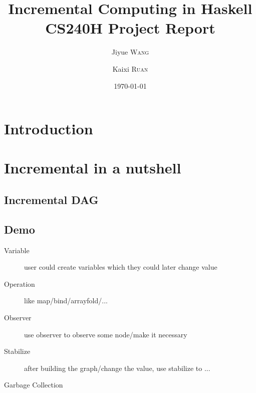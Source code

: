 \documentclass[a4paper, twocolumn]{article}
\title{Incremental Computing in Haskell\\CS240H Project Report}
\author[]{Jiyue \textsc{Wang}}
\author[]{Kaixi \textsc{Ruan}}
\affil[]{}
\date{\today}
\begin{document}
\maketitle 

\section{Introduction}

\section{Incremental in a nutshell }

\subsection{Incremental DAG}

\subsection{Demo}
\begin{description}
  \item [Variable] user could create variables which they could later change value 
  \item [Operation] like map/bind/arrayfold/...
  \item [Observer] use observer to observe some node/make it necessary
  \item [Stabilize] after building the graph/change the value, use stabilize to ...
  \item [Garbage Collection] 
\end{description}
 
\end{document}
